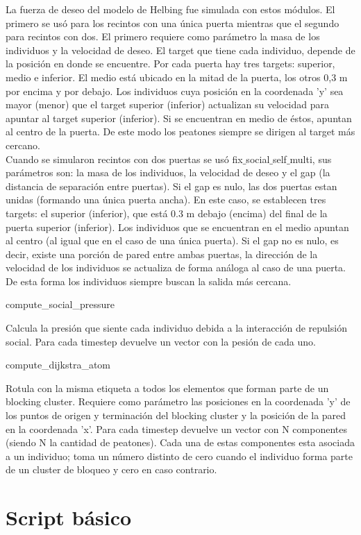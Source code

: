 La fuerza de deseo del modelo de Helbing fue simulada con estos módulos. El primero se usó para los recintos con una única puerta mientras que el segundo para recintos con dos. 
El primero requiere como parámetro la masa de los individuos y la velocidad de deseo. El target que tiene cada individuo, depende de la posición en donde se encuentre. Por cada puerta hay tres targets: superior, medio e inferior. El medio está ubicado en la mitad de la puerta, los otros 0,3 m por encima y por debajo.  Los individuos cuya posición en la coordenada 'y' sea mayor (menor) que el target superior (inferior) actualizan su velocidad para apuntar al target superior (inferior). Si se encuentran en medio de éstos, apuntan al centro de la puerta. De este modo los peatones siempre se dirigen al target más cercano.\\  
Cuando se simularon recintos con dos puertas se usó fix$\_$social$\_$self$\_$multi, sus parámetros son: la masa de los individuos, la velocidad de deseo y el gap (la distancia de separación entre puertas). Si el gap es nulo, las dos puertas estan unidas (formando una única puerta ancha). En este caso, se establecen tres targets: el superior (inferior), que está 0.3 m debajo (encima) del final de la puerta superior (inferior). Los individuos que se encuentran en el medio apuntan al centro (al igual que en el caso de una única puerta).
Si el gap no es nulo, es decir, existe una porción de pared entre ambas puertas, la dirección de la velocidad de los individuos se actualiza de forma análoga al caso de una puerta. De esta forma los individuos siempre buscan la salida más cercana. 

{\Large compute\_social\_pressure}

Calcula la presión que siente cada individuo debida a la interacción de repulsión social. Para cada timestep devuelve un vector con la pesión de cada uno. 

{\Large compute\_dijkstra\_atom}

Rotula con la misma etiqueta a todos los elementos que forman parte de un blocking cluster. Requiere como parámetro las posiciones en la coordenada 'y' de los puntos de origen y terminación del blocking cluster y la posición de la pared en la coordenada 'x'. Para cada timestep devuelve un vector con N componentes (siendo N la cantidad de peatones). Cada una de estas componentes esta asociada a un individuo; toma un número distinto de cero cuando el individuo forma parte de un cluster de bloqueo y cero en caso contrario. 

\section{Script básico}

